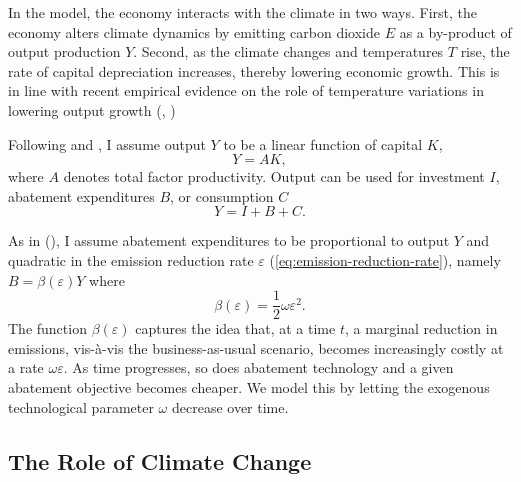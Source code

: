 \documentclass[../../main.tex]{subfiles}
\begin{document}
In the model, the economy interacts with the climate in two ways. First, the economy alters climate dynamics by emitting carbon dioxide $E$ as a by-product of output production $Y$. Second, as the climate changes and temperatures $T$ rise, the rate of capital depreciation increases, thereby lowering economic growth. This is in line with recent empirical evidence on the role of temperature variations in lowering output growth (\citeauthor{dell_temperature_2009}, \citeyear{dell_temperature_2009, dell_temperature_2012}) 

Following  and , I assume output $Y$ to be a linear function of capital $K$, \begin{equation}
Y =  A K,
\end{equation} where $A$ denotes total factor productivity. Output can be used for investment $I$, abatement expenditures $B$, or consumption $C$\begin{equation} \label{eq:nominal-budget}
    Y = I + B + C.
\end{equation}

As in \citeauthor{nordhaus_question_2008} (\citeyear{nordhaus_optimal_1992,nordhaus_question_2008}), I assume abatement expenditures to be proportional to output $Y$ and quadratic in the emission reduction rate $\varepsilon$ (\ref{eq:emission-reduction-rate}), namely $B = \beta(\varepsilon) Y $ where \begin{equation} \label{eq:abatement-costs}
    \beta(\varepsilon) = \frac{1}{2} \omega \varepsilon^2.
\end{equation} The function $\beta(\varepsilon)$ captures the idea that, at a time $t$, a marginal reduction in emissions, vis-à-vis the business-as-usual scenario, becomes increasingly costly at a rate $\omega \varepsilon$. As time progresses, so does abatement technology and a given abatement objective becomes cheaper. We model this by letting the exogenous technological parameter $\omega$ decrease over time.

\newpage
\subsection{The Role of Climate Change}
\end{document}
